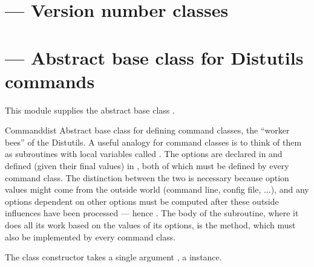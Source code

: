 \documentclass{manual}
\begin{document}
\section{ --- Version number classes}


%

\section{ --- Abstract base class for Distutils commands}

This module supplies the abstract base class . 

\begin{classdesc}{Command}{dist}
Abstract base class for defining command classes, the ``worker bees''
of the Distutils.  A useful analogy for command classes is to think of
them as subroutines with local variables called .  The
options are declared in  and defined
(given their final values) in , both of
which must be defined by every command class.  The distinction between
the two is necessary because option values might come from the outside
world (command line, config file, ...), and any options dependent on
other options must be computed after these outside influences have
been processed --- hence .  The body of the
subroutine, where it does all its work based on the values of its
options, is the  method, which must also be implemented
by every command class.

The class constructor takes a single argument , a 
 instance. 
\end{classdesc}
\end{document}
